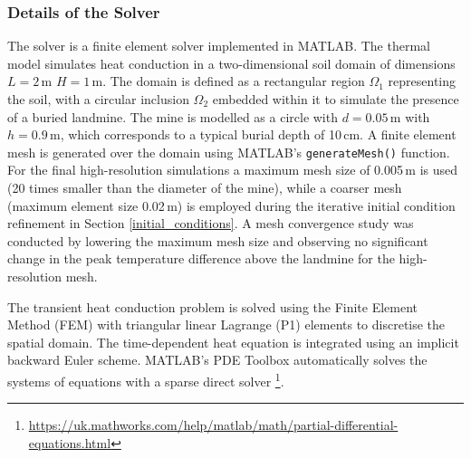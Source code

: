     
    \subsubsection{Details of the Solver}
    
        The solver is a finite element solver implemented in MATLAB. The thermal model simulates heat conduction in a two-dimensional soil domain of dimensions $L =2$\,m $H = 1$\,m. The domain is defined as a rectangular region $\Omega_1$ representing the soil, with a circular inclusion $\Omega_2$ embedded within it to simulate the presence of a buried landmine. The mine is modelled as a circle with \(d=0.05\,\text{m}\) with \(h=0.9\,\text{m}\), which corresponds to a typical burial depth of 10\,cm. A finite element mesh is generated over the domain using MATLAB's \texttt{generateMesh()} function. For the final high-resolution simulations a maximum mesh size of 0.005\,m is used (20 times smaller than the diameter of the mine), while a coarser mesh (maximum element size 0.02\,m) is employed during the iterative initial condition refinement in Section \ref{initial_conditions}. A mesh convergence study was conducted by lowering the maximum mesh size and observing no significant change in the peak temperature difference above the landmine for the high-resolution mesh.
        
        The transient heat conduction problem is solved using the Finite Element Method (FEM) with triangular linear Lagrange (P1) elements to discretise the spatial domain. The time-dependent heat equation is integrated using an implicit backward Euler scheme. MATLAB's PDE Toolbox automatically solves the systems of equations with a sparse direct solver \footnote{\url{https://uk.mathworks.com/help/matlab/math/partial-differential-equations.html}}.
    

